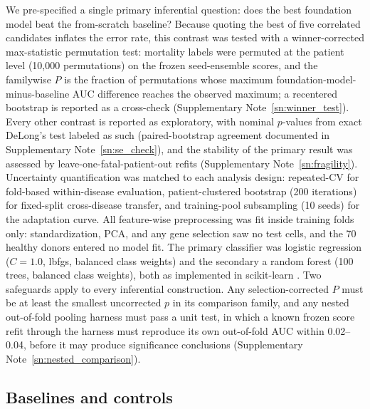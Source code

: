\documentclass[11pt,a4paper]{article}
\begin{document}
We pre-specified a single primary inferential question: does the best
foundation model beat the from-scratch baseline? Because quoting the best of
five correlated candidates inflates the error rate, this contrast was tested
with a winner-corrected max-statistic permutation test: mortality labels were
permuted at the patient level (10{,}000 permutations) on the frozen
seed-ensemble scores, and the familywise $P$ is the fraction of permutations
whose maximum foundation-model-minus-baseline AUC difference reaches the
observed maximum; a recentered bootstrap is reported as a cross-check
(Supplementary Note~\ref{sn:winner_test}).
Every other contrast is reported as
exploratory, with nominal $p$-values from exact DeLong's test \citep{delong1988comparing}
labeled as such
(paired-bootstrap agreement documented in Supplementary
Note~\ref{sn:se_check}), and the stability of the primary result was assessed by
leave-one-fatal-patient-out refits (Supplementary Note~\ref{sn:fragility}).
Uncertainty quantification was matched to each analysis
design: repeated-CV for fold-based within-disease evaluation, patient-clustered
bootstrap (200 iterations) for fixed-split cross-disease transfer, and
training-pool subsampling (10 seeds) for the adaptation curve.
All feature-wise preprocessing was fit inside training folds only:
standardization, PCA, and any gene selection saw no test cells, and the 70
healthy donors entered no model fit. The primary classifier was logistic
regression ($C=1.0$, lbfgs, balanced class weights) and the secondary a random
forest (100 trees, balanced class weights), both as implemented in
scikit-learn \citep{pedregosa2011scikit}.
Two safeguards apply to every inferential construction. Any
selection-corrected $P$ must be at least the smallest uncorrected $p$ in its
comparison family, and any nested out-of-fold pooling harness must pass a
unit test, in which a known frozen score refit through the harness must
reproduce its own out-of-fold AUC within 0.02--0.04, before it may produce
significance conclusions (Supplementary Note~\ref{sn:nested_comparison}).

\subsection{Baselines and controls}
\label{ssec:methods_baselines}
\end{document}
